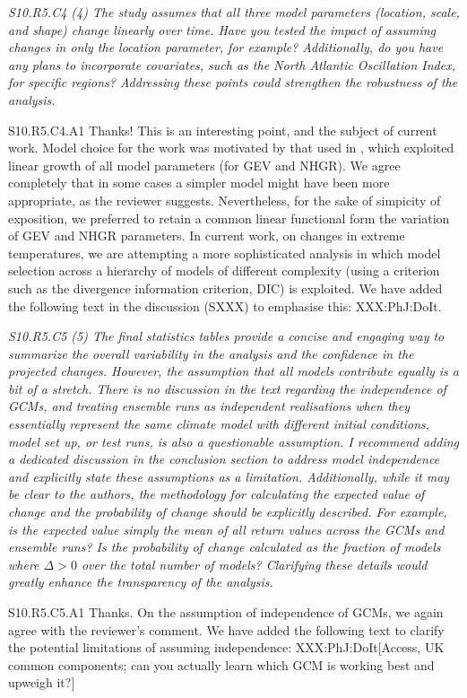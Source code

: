 \documentclass[a4paper,10pt]{article}
\begin{document}
	\emph{S10.R5.C4 (4) The study assumes that all three model parameters (location, scale, and shape) change linearly over time. Have you tested the impact of assuming changes in only the location parameter, for example? Additionally, do you have any plans to incorporate covariates, such as the North Atlantic Oscillation Index, for specific regions? Addressing these points could strengthen the robustness of the analysis.}

	S10.R5.C4.A1 Thanks! This is an interesting point, and the subject of current work. Model choice for the work was motivated by that used in \cite{EwnJnt23a}, which exploited linear growth of all model parameters (for GEV and NHGR). We agree completely that in some cases a simpler model might have been more appropriate, as the reviewer suggests. Nevertheless, for the sake of simpicity of exposition, we preferred to retain a common linear functional form the variation of GEV and NHGR parameters. In current work, on changes in extreme temperatures, we are attempting a more sophisticated analysis in which model selection across a hierarchy of models of different complexity (using a criterion such as the divergence information criterion, DIC) is exploited. We have added the following text in the discussion (SXXX) to emphasise this: XXX:PhJ:DoIt.

	\emph{S10.R5.C5 (5) The final statistics tables provide a concise and engaging way to summarize the overall variability in the analysis and the confidence in the projected changes. However, the assumption that all models contribute equally is a bit of a stretch. There is no discussion in the text regarding the independence of GCMs, and treating ensemble runs as independent realisations when they essentially represent the same climate model with different initial conditions, model set up, or test runs, is also a questionable assumption. I recommend adding a dedicated discussion in the conclusion section to address model independence and explicitly state these assumptions as a limitation. Additionally, while it may be clear to the authors, the methodology for calculating the expected value of change and the probability of change should be explicitly described. For example, is the expected value simply the mean of all return values across the GCMs and ensemble runs? Is the probability of change calculated as the fraction of models where $\Delta > 0$ over the total number of models? Clarifying these details would greatly enhance the transparency of the analysis.}

	S10.R5.C5.A1 Thanks. On the assumption of independence of GCMs, we again agree with the reviewer's comment. We have added the following text to clarify the potential limitations of assuming independence: XXX:PhJ:DoIt[Access, UK common components; can you actually learn which GCM is working best and upweigh it?]
\end{document}
